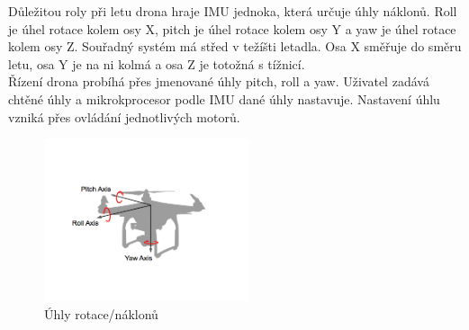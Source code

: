 Důležitou roly při letu drona hraje IMU jednoka, která určuje úhly náklonů. Roll je úhel rotace kolem osy X, pitch je úhel rotace kolem osy Y a yaw je úhel rotace kolem osy Z. Souřadný systém má střed v težíšti letadla. Osa X směřuje do směru letu, osa Y je na ni kolmá a osa Z je totožná s tížnicí.\\
Řízení drona probíhá přes jmenované úhly pitch, roll a yaw. Uživatel zadává chtěné úhly a mikrokprocesor podle IMU dané úhly nastavuje. Nastavení úhlu vzniká přes ovládání jednotlivých motorů.\\

\begin{figure}[h]
	\centering
	\includegraphics[width=6cm]{pictures/rotangle.png}
	\caption{Úhly rotace/náklonů}
\end{figure} 
